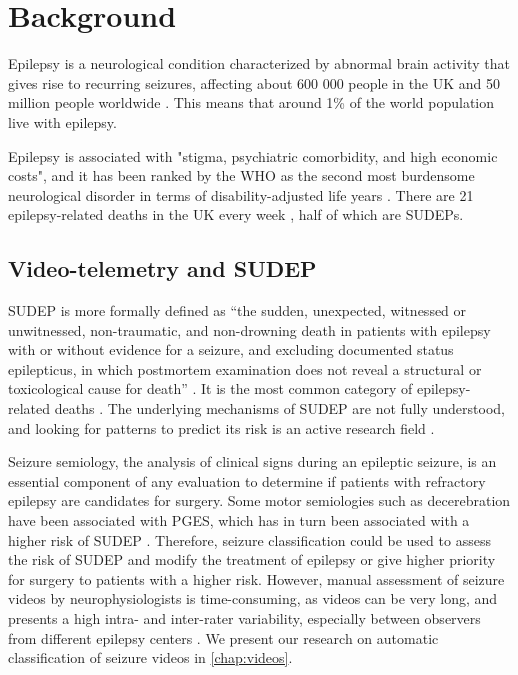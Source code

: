\section{Background}

Epilepsy is a neurological condition characterized by abnormal brain activity that gives rise to recurring seizures, affecting about 600 000 people in the UK and 50 million people worldwide \cite{nice_epilepsies_2012,fiest_prevalence_2017}.
This means that around 1\% of the world population live with epilepsy.

Epilepsy is associated with "stigma, psychiatric comorbidity, and high economic costs", and it has been ranked by the \ac{WHO} as the second most burdensome neurological disorder in terms of disability-adjusted life years \cite{fiest_prevalence_2017}.
There are 21 epilepsy-related deaths in the UK every week%
,
half of which are \acp{SUDEP}.  %


\subsection{Video-telemetry and SUDEP}

\ac{SUDEP} is more formally defined as ``the sudden, unexpected, witnessed or unwitnessed, non-traumatic, and non-drowning death in patients with epilepsy with or without evidence for a seizure, and excluding documented status epilepticus, in which postmortem examination does not reveal a structural or toxicological cause for death'' \cite{nashef_sudden_1997}.
It is the most common category of epilepsy-related deaths \cite{devinsky_sudden_2016}.
The underlying mechanisms of \ac{SUDEP} are not fully understood, and looking for patterns to predict its risk is an active research field \cite{so_what_2008,jha_sudden_2021}.

Seizure semiology, the analysis of clinical signs during an epileptic seizure, is an essential component of any evaluation to determine if patients with refractory epilepsy are candidates for surgery.
Some motor semiologies such as decerebration have been associated with \ac{PGES}, which has in turn been associated with a higher risk of \ac{SUDEP} \cite{alexandre_risk_2015,vilella_association_2021}.
Therefore, seizure classification could be used to assess the risk of \ac{SUDEP} and modify the treatment of epilepsy or give higher priority for surgery to patients with a higher risk.
However, manual assessment of seizure videos by neurophysiologists is time-consuming, as videos can be very long, and presents a high intra- and inter-rater variability, especially between observers from different epilepsy centers \cite{tufenkjian_seizure_2012}.
We present our research on automatic classification of seizure videos in \cref{chap:videos}.


